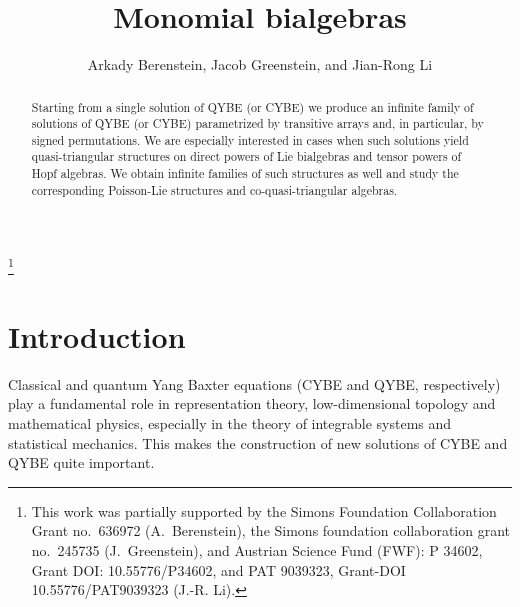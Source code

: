 \documentclass[12pt, reqno]{amsart}
\theoremstyle{definition}
\numberwithin{equation}{section}
\begin{document}
\title{Monomial bialgebras}
\author{Arkady Berenstein, Jacob Greenstein, and Jian-Rong Li}
\address{Arkady Berenstein, Department of Mathematics, University of Oregon, Eugene, OR 97403, USA}
\address{Jacob Greenstein, Department of Mathematics, University of California, Riverside, CA 92521, USA}
\address{Jian-Rong Li, Department of Mathematics, Universit\"at Wien,
Vienna, Austria}
\date{}
\thanks{This work was partially supported by the Simons Foundation Collaboration Grant no.~636972 (A.~Berenstein), the Simons
foundation collaboration grant no.~245735 (J.~Greenstein), and Austrian Science Fund (FWF): P 34602, Grant DOI: 10.55776/P34602, and PAT 9039323, Grant-DOI 10.55776/PAT9039323 (J.-R. Li).
}


\begin{abstract}
Starting from 
a single solution of QYBE (or CYBE) we produce an infinite family of 
solutions of QYBE (or CYBE) parametrized by transitive arrays and, in particular, by signed permutations. We are especially interested in
cases when such solutions yield quasi-triangular
structures on direct powers of Lie bialgebras and tensor 
powers of Hopf algebras. We obtain infinite families of such structures as well and study the corresponding
Poisson-Lie structures and co-quasi-triangular algebras.
\end{abstract}

\maketitle 

\tableofcontents

\section{Introduction}
Classical and quantum Yang Baxter equations (CYBE and QYBE, respectively) play a fundamental role in representation theory, low-dimensional topology and mathematical physics,
especially in the theory of integrable
systems and statistical mechanics. This makes the construction of new solutions of CYBE and QYBE quite important. 
\end{document}
